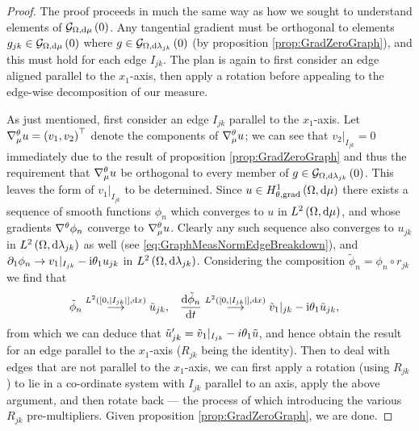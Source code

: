 \begin{proof}
	The proof proceeds in much the same way as how we sought to understand elements of $\mathcal{G}_{ \Omega, \mathrm{d}\mu}\left( 0 \right)$.
	Any tangential gradient must be orthogonal to elements $g_{jk}\in\mathcal{G}_{ \Omega, \mathrm{d}\mu}\left( 0 \right)$ where $g\in\mathcal{G}_{ \Omega, \mathrm{d}\lambda_{jk}}\left( 0 \right)$ (by proposition \ref{prop:GradZeroGraph}), and this must hold for each edge $I_{jk}$.
	The plan is again to first consider an edge aligned parallel to the $x_1$-axis, then apply a rotation before appealing to the edge-wise decomposition of our measure. \newline
	
	As just mentioned, first consider an edge $I_{jk}$ parallel to the $x_1$-axis. 
	Let $\nabla^{\theta}_\mu u = \left( v_1, v_2 \right)^\top$ denote the components of $\nabla^{\theta}_\mu u$; we can see that $v_2\vert_{I_{jk}}=0$ immediately due to the result of proposition \ref{prop:GradZeroGraph} and thus the requirement that $\nabla^{\theta}_\mu u$ be orthogonal to every member of $g\in\mathcal{G}_{ \Omega, \mathrm{d}\lambda_{jk}}\left( 0 \right)$.
	This leaves the form of $v_1\vert_{I_{jk}}$ to be determined.
	Since $u\in H^1_{\theta, \mathrm{grad}}\left( \Omega, \mathrm{d}\mu \right)$ there exists a sequence of smooth functions $\phi_n$ which converges to $u$ in $L^{2}\left( \Omega,\mathrm{d}\mu \right)$, and whose gradients $\nabla^{\theta}\phi_n$ converge to $\nabla^{\theta}_\mu u$.
	Clearly any such sequence also converges to $u_{jk}$ in $L^{2}\left( \Omega,\mathrm{d}\lambda_{jk} \right)$ as well (see \eqref{eq:GraphMeasNormEdgeBreakdown}), and $\partial_1\phi_n\rightarrow v_1\vert_{I_{jk}}-\mathrm{i}\theta_{1}u_{jk}$ in $L^{2}\left( \Omega,\mathrm{d}\lambda_{jk} \right)$.
	Considering the composition $\tilde{\phi}_n = \phi_n \circ r_{jk}$ we find that
	\begin{align*}
		\tilde{\phi}_n \overset{L^{2}\left( \left[ 0,\left\lvert I_{jk} \right\rvert \right],\mathrm{d}x \right)}{\longrightarrow} \tilde{u}_{jk},
		&\quad \dfrac{\mathrm{d}\tilde{\phi}_n}{\mathrm{d}t} \overset{L^{2}\left( \left[ 0,\left\lvert I_{jk} \right\rvert \right],\mathrm{d}x \right)}{\longrightarrow} \tilde{v}_1\vert_{jk} - \mathrm{i}\theta_1 \tilde{u}_{jk},
	\end{align*}
	from which we can deduce that $\tilde{u}_{jk}' = \tilde{v}_1\vert_{I_{jk}} - i\theta_1\tilde{u}$, and hence obtain the result for an edge parallel to the $x_1$-axis ($R_{jk}$ being the identity).
	Then to deal with edges that are not parallel to the $x_1$-axis, we can first apply a rotation (using $R_{jk}$) to lie in a co-ordinate system with $I_{jk}$ parallel to an axis, apply the above argument, and then rotate back --- the process of which introducing the various $R_{jk}$ pre-multipliers.
	Given proposition \ref{prop:GradZeroGraph}, we are done.
\end{proof}

